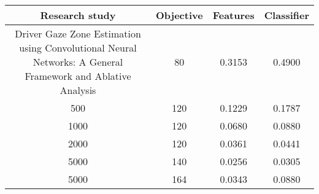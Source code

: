 
\blindtext[1]

\begin{center}
\begin{tabular}{|c|c|c|c|}
\hline
Research study & Objective & Features & Classifier\\
\hline
Driver Gaze Zone Estimation using Convolutional Neural Networks:
A General Framework and Ablative Analysis & 80& 0.3153 & 0.4900\\
500 & 120& 0.1229& 0.1787\\
1000 & 120& 0.0680& 0.0880\\
2000 & 120& 0.0361& 0.0441\\
5000 & 140& 0.0256& 0.0305\\
5000 & 164& 0.0343& 0.0880\\
\hline
\end{tabular}
\label{tab:table1}
\end{center}

\blindtext[3]